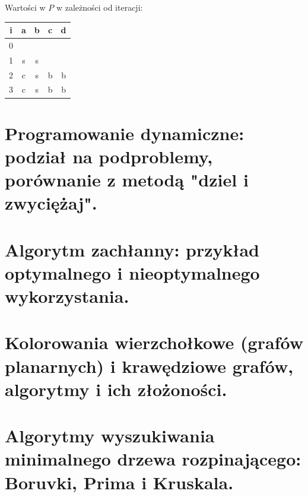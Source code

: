\documentclass[12pt]{article}
\begin{document}
\begin{center}
                \[\]
                Wartości w $P$ w zależności od iteracji:

                \begin{tabular}{c||c|c|c|c}
                    i & a & b & c & d \\
                    \hline \hline
                    0 &   &   &  &  \\
                    \hline
                    1 & s & s &  &  \\
                    \hline
                    2 & c & s & b & b \\
                    \hline
                    3 & c & s & b & b \\
                \end{tabular} 
            \end{center}
        
        \newpage


    \section{Programowanie dynamiczne: podział na podproblemy, porównanie z metodą "dziel i zwyciężaj".}
    \section{Algorytm zachłanny: przykład optymalnego i nieoptymalnego wykorzystania.}
    \section{Kolorowania wierzchołkowe (grafów planarnych) i krawędziowe grafów, algorytmy i ich złożoności.}

    \newpage

    \section{Algorytmy wyszukiwania minimalnego drzewa rozpinającego: Boruvki, Prima i Kruskala.}
    
\end{document}
